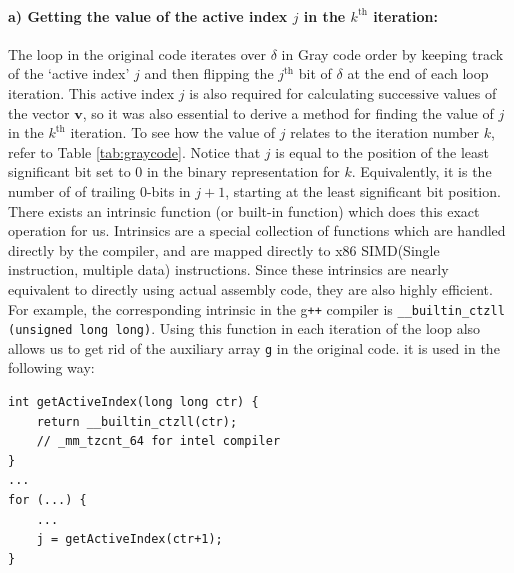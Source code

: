 \documentclass[ %
                    author={Manan Vaswani},
                supervisor={Dr. Raphael Clifford},
                    degree={MEng},
                     title={A multi-core CPU implementation of the classical Boson Sampling algorithm},
                  subtitle={},
                      type={},
                      year={2019} ]{dissertation}
\theoremstyle{plain}
\theoremstyle{definition}
\begin{document}
\paragraph{a) Getting the value of the active index $j$ in the $k^{\text{th}}$ iteration:} The loop in the original code iterates over $\delta$ in Gray code order by keeping track of the `active index' $j$ and then flipping the $j^{\text{th}}$ bit of $\delta$ at the end of each loop iteration. This active index $j$ is also required for calculating successive values of the vector $\mathbf{v}$, so it was also essential to derive a method for finding the value of $j$ in the $k^{\text{th}}$ iteration. To see how the value of $j$ relates to the iteration number $k$, refer to Table \ref{tab:graycode}. Notice that $j$ is equal to the position of the least significant bit set to 0 in the binary representation for $k$. Equivalently, it is the number of of trailing 0-bits in $j+1$, starting at the least significant bit position. There exists an intrinsic function (or built-in function) which does this exact operation for us. Intrinsics are a special collection of functions which are handled directly by the compiler, and are mapped directly to x86 SIMD(Single instruction, multiple data) instructions. Since these intrinsics are nearly equivalent to directly using actual assembly code, they are also highly efficient. For example, the corresponding intrinsic in the g\texttt{++} compiler is \texttt{__builtin_ctzll (unsigned long long)}. Using this function in each iteration of the loop also allows us to get rid of the auxiliary array \texttt{g} in the original code. it is used in the following way:
\begin{verbatim}
int getActiveIndex(long long ctr) {
	return __builtin_ctzll(ctr);
	// _mm_tzcnt_64 for intel compiler
}
...
for (...) {
    ...
    j = getActiveIndex(ctr+1);
}
\end{verbatim}
\end{document}
